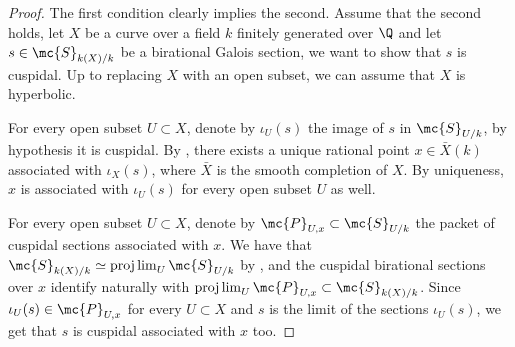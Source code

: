 \begin{proof}
    The first condition clearly implies the second. Assume that the second holds, let $X$ be a curve over a field $k$ finitely generated over $\Q$ and let $s\in\mc{S}_{k(X)/k}$ be a birational Galois section, we want to show that $s$ is cuspidal. Up to replacing $X$ with an open subset, we can assume that $X$ is hyperbolic.

    For every open subset $U\subset X$, denote by $\iota_{U}(s)$ the image of $s$ in $\mc{S}_{U/k}$, by hypothesis it is cuspidal. By \cite[Theorem 17 (2)]{sti12}, there exists a unique rational point $x\in\bar{X}(k)$ associated with $\iota_{X}(s)$, where $\bar{X}$ is the smooth completion of $X$. By uniqueness, $x$ is associated with $\iota_{U}(s)$ for every open subset $U$ as well.

    For every open subset $U\subset X$, denote by $\mc{P}_{U,x}\subset\mc{S}_{U/k}$ the packet of cuspidal sections associated with $x$. We have that $\mc{S}_{k(X)/k}\simeq\projlim_{U}\mc{S}_{U/k}$ by \cite[Lemma 259]{sti13}, and the cuspidal birational sections over $x$ identify naturally with $\projlim_{U}\mc{P}_{U,x}\subset\mc{S}_{k(X)/k}$. Since $\iota_{U}(s)\in\mc{P}_{U,x}$ for every $U\subset X$ and $s$ is the limit of the sections $\iota_{U}(s)$, we get that $s$ is cuspidal associated with $x$ too.
\end{proof}

